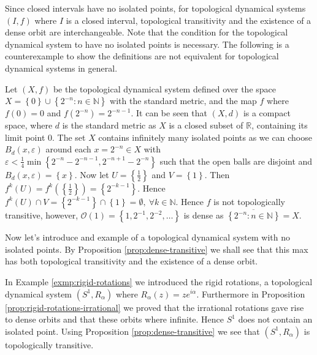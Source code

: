 Since closed intervals have no isolated points, for topological dynamical systems $(I, f)$ where $I$ is a closed interval, topological transitivity and the existence of a dense orbit are interchangeable. Note that the condition for the topological dynamical system to have no isolated points is necessary. The following is a counterexample to show the definitions are not equivalent for topological dynamical systems in general.

\begin{exmp} \label{exmp:dense-orbit-not-equal-transitive}
    Let $(X, f)$ be the topological dynamical system defined over the space $X = \left\lbrace 0 \right\rbrace \cup \left\lbrace 2^{-n} : n \in \mathbb{N} \right\rbrace$ with the standard metric, and the map $f$ where $f(0) = 0$ and $f(2^{-n}) = 2^{-n-1}$. It can be seen that $(X, d)$ is a compact space, where $d$ is the standard metric as $X$ is a closed subset of $\mathbb{R}$, containing its limit point $0$. The set $X$ contains infinitely many isolated points as we can choose $B_d(x, \varepsilon)$ around each $x = 2^{-n} \in X$ with $\varepsilon < \frac{1}{4} \min\left\lbrace 2^{-n} - 2^{-n-1}, 2^{-n + 1} - 2^{-n} \right\rbrace$ such that the open balls are disjoint and $B_d(x, \varepsilon) = \left\lbrace x \right\rbrace$. Now let $U = \left\lbrace \frac{1}{2} \right\rbrace$ and $V = \left\lbrace 1 \right\rbrace$. Then $f^k(U) = f^k(\left\lbrace \frac{1}{2} \right\rbrace) = \left\lbrace 2^{-k-1} \right\rbrace$. Hence $f^k(U) \cap V = \left\lbrace 2^{-k-1} \right\rbrace \cap \left\lbrace 1 \right\rbrace = \emptyset, \ \forall k \in \mathbb{N}$. Hence $f$ is not topologically transitive, however, $\mathcal{O}(1) = \left\lbrace 1, 2^{-1}, 2^{-2}, \dots \right\rbrace$ is dense as $\overline{\left\lbrace2^{-n}: n \in \mathbb{N}\right\rbrace} = X$.
\end{exmp}

Now let's introduce and example of a topological dynamical system with no isolated points. By Proposition \ref{prop:dense-transitive} we shall see that this max has both topological transitivity and the existence of a dense orbit.

\begin{exmp} \label{exmp:dense-orbit-and-transitive}
    In Example \ref{exmp:rigid-rotations} we introduced the rigid rotations, a topological dynamical system $(S^1, R_\alpha)$ where $R_{\alpha}(z) = ze^{i\alpha}$. Furthermore in Proposition \ref{prop:rigid-rotations-irrational} we proved that the irrational rotations gave rise to dense orbits and that these orbits where infinite. Hence $S^1$ does not contain an isolated point. Using Proposition \ref{prop:dense-transitive} we see that $(S^1, R_\alpha)$ is topologically transitive.
\end{exmp}

